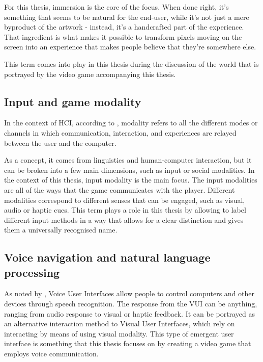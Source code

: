 For this thesis, immersion is the core of the focus. When done right, it's something that seems to be natural for the end-user, while it's not just a mere byproduct of the artwork - instead, it's a handcrafted part of the experience. That ingredient is what makes it possible to transform pixels moving on the screen into an experience that makes people believe that they're somewhere else.

This term comes into play in this thesis during the discussion of the world that is portrayed by the video game accompanying this thesis. 


\subsection{Input and game modality}


In the context of HCI, according to \textcite{fakhreddinekarraymiladalemzadehjamilabousalehandmonoursarabHumanComputerInteractionOverview2008}, modality refers to all the different modes or channels in which communication, interaction, and experiences are relayed between the user and the computer. 


As a concept, it comes from linguistics and human-computer interaction, but it can be broken into a few main dimensions, such as input or social modalities.
In the context of this thesis, input modality is the main focus. 
The input modalities are all of the ways that the game communicates with the player. Different modalities correspond to different senses that can be engaged, such as visual, audio or haptic cues. 
This term plays a role in this thesis by allowing to label different input methods in a way that allows for a clear distinction and gives them a universally recognised name. 















\subsection{Voice navigation and natural language processing}







As noted by \textcite{interactiondesignfoundationWhatAreVoice2025}, Voice User Interfaces allow people to control computers and other devices through speech recognition.
The response from the VUI can be anything, ranging from audio response to visual or haptic feedback.
It can be portrayed as an alternative interaction method to Visual User Interfaces, which rely on interacting by means of using visual modality. 
This type of emergent user interface is something that this thesis focuses on by creating a video game that employs voice communication. 











